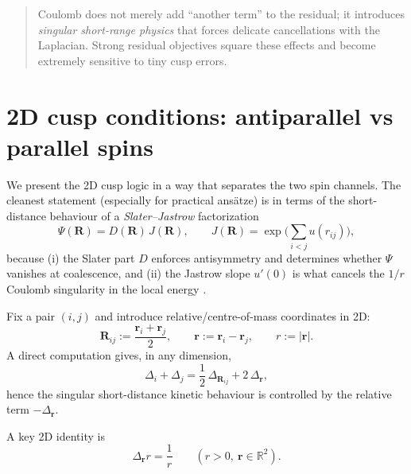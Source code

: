 \begin{quote}
Coulomb does not merely add ``another term'' to the residual; it introduces
\emph{singular short-range physics} that forces delicate cancellations with the
Laplacian. Strong residual objectives square these effects and become extremely
sensitive to tiny cusp errors.
\end{quote}

\section{2D cusp conditions: antiparallel vs parallel spins}
\label{app:coulomb:cusp}

We present the 2D cusp logic in a way that separates the two spin channels.
The cleanest statement (especially for practical ans\"atze) is in terms of the
short-distance behaviour of a \emph{Slater--Jastrow} factorization
\begin{equation}
\Psi(\mathbf R)=D(\mathbf R)\,J(\mathbf R),
\qquad
J(\mathbf R)=\exp\!\Big(\sum_{i<j} u(r_{ij})\Big),
\label{eq:coulomb:slater-jastrow}
\end{equation}
because (i) the Slater part $D$ enforces antisymmetry and determines whether $\Psi$
vanishes at coalescence, and (ii) the Jastrow slope $u'(0)$ is what cancels the
$1/r$ Coulomb singularity in the local energy \cite{BeccaSorella2017-QMCBook}.

Fix a pair $(i,j)$ and introduce relative/centre-of-mass coordinates in 2D:
\begin{equation}
\mathbf R_{ij} := \frac{\mathbf r_i+\mathbf r_j}{2},
\qquad
\mathbf r := \mathbf r_i-\mathbf r_j,
\qquad
r:=|\mathbf r|.
\end{equation}
A direct computation gives, in any dimension,
\begin{equation}
\Delta_i+\Delta_j = \frac12\,\Delta_{\mathbf R_{ij}} + 2\,\Delta_{\mathbf r},
\label{eq:coulomb:lap_decomp}
\end{equation}
hence the singular short-distance kinetic behaviour is controlled by the relative term
$-\Delta_{\mathbf r}$.

A key 2D identity is
\begin{equation}
\Delta_{\mathbf r} r = \frac{1}{r}\qquad (r>0,\ \mathbf r\in\mathbb R^2).
\label{eq:coulomb:lap_r_2d}
\end{equation}


